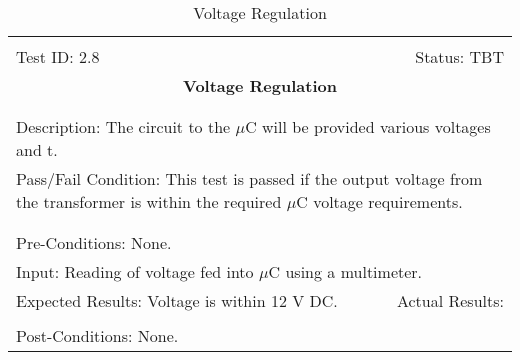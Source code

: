 \documentclass[titlepage]{article}
\begin{document}
\begin{center}%
\begin{table}
\begin{tabular}{|l r|}\hline&\\[-2mm]
	Test ID: 2.8	&Status: TBT\\[-3mm]
	\multicolumn{2}{|c|}{\textbf{\large{Voltage Regulation}}}\\&\\\hline&\\[-3mm]
	\multicolumn{2}{|p{\textwidth}|}{Description: The circuit to the $\mu$C will be provided various voltages and t.}\\[1mm]
	\multicolumn{2}{|p{\textwidth}|}{Pass/Fail Condition: This test is passed if the output voltage from the transformer is within the required $\mu$C voltage requirements.}\\[1mm]\hline&\\[-3mm]\hline&\\[-3mm]%
	\multicolumn{2}{|p{\textwidth}|}{Pre-Conditions: None.}\\[4mm]
	\multicolumn{2}{|p{\textwidth}|}{Input: Reading of voltage fed into $\mu$C using a multimeter.}\\[2mm]\hline
	\multicolumn{1}{|p{0.49\textwidth}}{Expected Results: Voltage is within 12 V DC.}	&\multicolumn{1}{|p{0.45\textwidth}|}{Actual Results:}\\\hline&\\[-3mm]%
	\multicolumn{2}{|p{\textwidth}|}{Post-Conditions: None.}\\\hline
\end{tabular}
\caption{Voltage Regulation}
\end{table}
\end{center}
\end{document}
